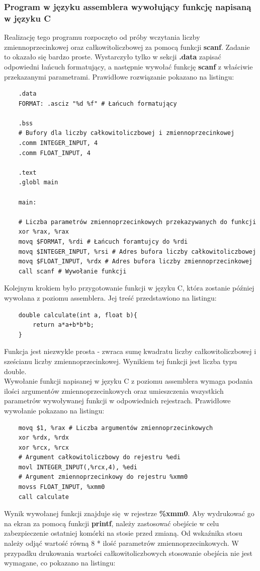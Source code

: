 \documentclass[a4paper,12pt]{article}
\begin{document}
\subsubsection{Program w języku assemblera wywołujący funkcję napisaną w języku C}
Realizację tego programu rozpoczęto od próby wczytania liczby zmiennoprzecinkowej oraz całkowitoliczbowej za pomocą funkcji \textbf{scanf}. Zadanie to okazało się bardzo proste. Wystarczyło tylko w sekcji \textbf{.data} zapisać odpowiedni łańcuch formatujący, a następnie wywołać funkcję \textbf{scanf} z właściwie przekazanymi parametrami. Prawidłowe rozwiązanie pokazano na listingu:
\begin{verbatim}
	.data
	FORMAT: .asciz "%d %f" # Łańcuch formatujący
	
	.bss
	# Bufory dla liczby całkowitoliczbowej i zmiennoprzecinkowej
	.comm INTEGER_INPUT, 4
	.comm FLOAT_INPUT, 4
	
	.text
	.globl main
	
	main:
	
	# Liczba parametrów zmiennoprzecinkowych przekazywanych do funkcji
	xor %rax, %rax 
	movq $FORMAT, %rdi # Łańcuch foramtujcy do %rdi
	movq $INTEGER_INPUT, %rsi # Adres bufora liczby całkowitoliczbowej
	movq $FLOAT_INPUT, %rdx # Adres bufora liczby zmiennoprzecinkowej
	call scanf # Wywołanie funkcji
\end{verbatim}
Kolejnym krokiem było przygotowanie funkcji w języku C, która zostanie później wywołana z poziomu assemblera. Jej treść przedstawiono na listingu:
\begin{verbatim}
	double calculate(int a, float b){
		return a*a+b*b*b;
	}
\end{verbatim}
Funkcja jest niezwykle prosta - zwraca sumę kwadratu liczby całkowitoliczbowej i sześcianu liczby zmiennoprzecinkowej. Wynikiem tej funkcji jest liczba typu double.\\
Wywołanie funkcji napisanej w języku C z poziomu assemblera  wymaga podania ilości argumentów zmiennoprzecinkowych oraz umieszczenia wszystkich parametrów wywoływanej funkcji w odpowiednich rejestrach. Prawidłowe wywołanie pokazano na listingu:
\begin{verbatim}
	movq $1, %rax # Liczba argumentów zmiennoprzecinkowych
	xor %rdx, %rdx 
	xor %rcx, %rcx
	# Argument całkowitoliczbowy do rejestru %edi
	movl INTEGER_INPUT(,%rcx,4), %edi
	# Argument zmiennoprzecinkowy do rejestru %xmm0
	movss FLOAT_INPUT, %xmm0
	call calculate
\end{verbatim}
Wynik wywołanej funkcji znajduje się w rejestrze \textbf{\%xmm0}. Aby wydrukować go na ekran za pomocą funkcji \textbf{printf}, należy zastosować obejście w celu zabezpieczenie ostatniej komórki na stosie przed zmianą. Od wskaźnika stosu należy odjąć wartość równą 8 * ilość parametrów zmiennoprzecinkowych. W przypadku drukowania wartości całkowitoliczbowych stosowanie obejścia nie jest wymagane, co pokazano na listingu:
\end{document}
